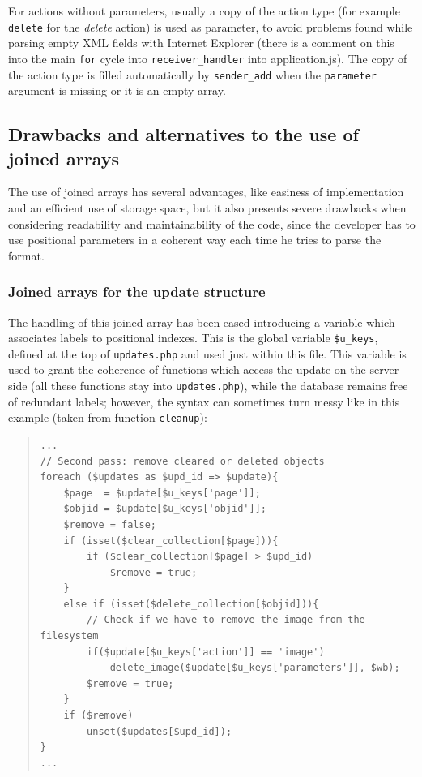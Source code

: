 \documentclass[10pt,a4paper,english]{book}
\begin{document}
For actions without parameters, usually a copy of the action type (for
example \texttt{delete} for the \emph{delete} action) is used as parameter, to
avoid problems found while parsing empty XML fields with Internet
Explorer (there is a comment on this into the main \texttt{for} cycle into
\texttt{receiver{\_}handler} into application.js). The copy of the action type
is filled automatically by \texttt{sender{\_}add} when the \texttt{parameter}
argument is missing or it is an empty array.



\hypertarget{drawbacks-and-alternatives-to-the-use-of-joined-arrays}{}
\subsection{Drawbacks and alternatives to the use of joined arrays}
\label{drawbacks-and-alternatives-to-the-use-of-joined-arrays}

The use of joined arrays has several advantages, like easiness of
implementation and an efficient use of storage space, but it also
presents severe drawbacks when considering readability and
maintainability of the code, since the developer has to use positional
parameters in a coherent way each time he tries to parse the format.



\hypertarget{joined-arrays-for-the-update-structure}{}
\subsubsection{Joined arrays for the update structure}
\label{joined-arrays-for-the-update-structure}

The handling of this joined array has been eased introducing a
variable which associates labels to positional indexes. This is the
global variable \texttt{{\$}u{\_}keys}, defined at the top of \texttt{updates.php} and
used just within this file. This variable is used to grant the
coherence of functions which access the update on the server side (all
these functions stay into \texttt{updates.php}), while the database remains
free of redundant labels; however, the syntax can sometimes turn messy
like in this example (taken from function \texttt{cleanup}):
\begin{quote}\begin{verbatim}
...
// Second pass: remove cleared or deleted objects
foreach ($updates as $upd_id => $update){
    $page  = $update[$u_keys['page']];
    $objid = $update[$u_keys['objid']];
    $remove = false;
    if (isset($clear_collection[$page])){
        if ($clear_collection[$page] > $upd_id)
            $remove = true;
    }
    else if (isset($delete_collection[$objid])){
        // Check if we have to remove the image from the filesystem
        if($update[$u_keys['action']] == 'image')
            delete_image($update[$u_keys['parameters']], $wb);
        $remove = true;
    }
    if ($remove)
        unset($updates[$upd_id]);
}
...
\end{verbatim}
\end{quote}
\end{document}
